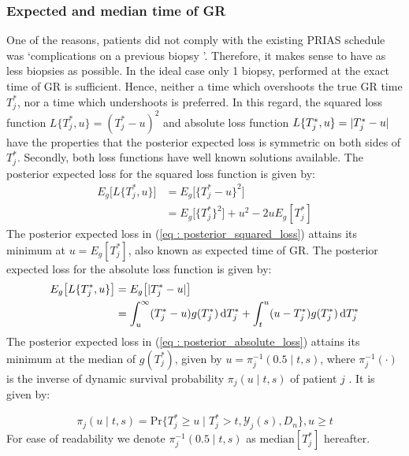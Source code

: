 \subsubsection{Expected and median time of GR}
\label{subsubsec : exp_median_fail_time}
One of the reasons, patients did not comply with the existing PRIAS schedule was \textquoteleft complications on a previous biopsy \textquoteright. Therefore, it makes sense to have as less biopsies as possible. In the ideal case only 1 biopsy, performed at the exact time of GR is sufficient. Hence, neither a time which overshoots the true GR time $T^*_j$, nor a time which undershoots is preferred. In this regard, the squared loss function $L\{T^*_j, u\} = (T^*_j - u)^2$ and absolute loss function $L\{T^*_j, u\} = \lvert T^*_j - u\rvert$ have the properties that the posterior expected loss is symmetric on both sides of $T^*_j$. Secondly, both loss functions have well known solutions available. The posterior expected loss for the squared loss function is given by:
\begin{equation}
\label{eq : posterior_squared_loss}
\begin{split}
E_g\big[L\{T^*_j, u\}\big] &= E_g\big[\{T^*_j - u\}^2\big]\\
&=E_g\big[\{T^*_j\}^2\big] + u^2 -2uE_g[T^*_j]
\end{split}
\end{equation}
The posterior expected loss in (\ref{eq : posterior_squared_loss}) attains its minimum at $u = E_g[T^*_j]$, also known as expected time of GR. The posterior expected loss for the absolute loss function is given by:
\begin{equation}
\label{eq : posterior_absolute_loss}
\begin{split}
E_g\big[L\{T^*_j, u\}\big] &= E_g\big[\lvert T^*_j - u\rvert\big]\\
&= \int_u^\infty (T^*_j - u) g(T^*_j)\mathop{}\!\mathrm{d} T^*_j + \int_t^u (u - T^*_j) g(T^*_j)\mathop{}\!\mathrm{d} T^*_j\\
\end{split}
\end{equation}
The posterior expected loss in (\ref{eq : posterior_absolute_loss}) attains its minimum at the median of $g(T^*_j)$, given by $u = \pi_j^{-1}(0.5 \mid t,s)$, where $\pi_j^{-1}(\cdot)$ is the inverse of dynamic survival probability $\pi_j(u \mid t, s)$ of patient $j$ \citep{rizopoulos2011dynamic}. It is given by:

\begin{equation}
\label{eq : dynamic_surv_prob}
\pi_j(u \mid t, s) = \mbox{Pr}\big\{T^*_j \geq u \mid  T^*_j >t, \mathcal{Y}_j(s), D_n\big\}, u \geq t
\end{equation}
For ease of readability we denote $\pi_j^{-1}(0.5 \mid t,s)$ as $\mbox{median}[T^*_j]$ hereafter.

